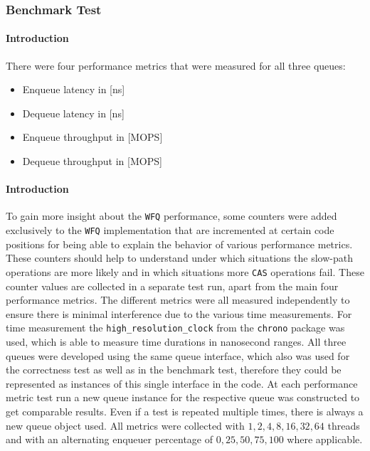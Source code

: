 \documentclass{article}
\newcommand{\WFQ}{\texttt{WFQ}}
\begin{document}
\subsubsection{Benchmark Test\label{sec:eval-methodology-benchmark}}
\paragraph{Introduction}
There were four performance metrics that were measured for all three queues:
\begin{itemize}
    \item{Enqueue latency in [ns]}
    \item{Dequeue latency in [ns]}
    \item{Enqueue throughput in [MOPS]}
    \item{Dequeue throughput in [MOPS]}
\end{itemize}
\paragraph{Introduction}
To gain more insight about the \WFQ{} performance, some counters were added exclusively to the \WFQ{} implementation that are incremented at certain code positions for being able to explain the behavior of various performance metrics. These counters should help to understand under which situations the slow-path operations are more likely and in which situations more \texttt{CAS} operations fail. These counter values are collected in a separate test run, apart from the main four performance metrics. The different metrics were all measured independently to ensure there is minimal interference due to the various time measurements. For time measurement the \texttt{high\_resolution\_clock} from the \texttt{chrono} package was used, which is able to measure time durations in nanosecond ranges. All three queues were developed using the same queue interface, which also was used for the correctness test as well as in the benchmark test, therefore they could be represented as instances of this single interface in the code. At each performance metric test run a new queue instance for the respective queue was constructed to get comparable results. Even if a test is repeated multiple times, there is always a new queue object used. All metrics were collected with $1,2,4,8,16,32,64$ threads and with an alternating enqueuer percentage of $0,25,50,75,100$ where applicable.
\end{document}
